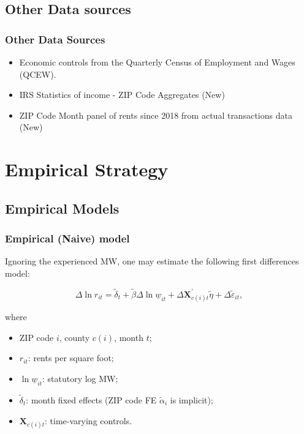 \documentclass[aspectratio=169, t]{beamer}
\newcommand{\MW}{\underline{w}}
\begin{document}
\subsection{Other Data sources}

\begin{frame}
	\frametitle{Other Data Sources} 
	
	\begin{itemize}
		\item Economic controls from the Quarterly Census of Employment and Wages 
		{\small (QCEW)}.
		\vspace{2mm}  \item IRS Statistics of income - ZIP Code Aggregates (New)
		\vspace{2mm} \item ZIP Code Month panel of rents since 2018 from actual transactions data (New)
	\end{itemize}
\end{frame}

\section{Empirical Strategy}

\subsection{Empirical Models}

\begin{frame}[label = stat_only_model]
	\frametitle{Empirical (Naive) model}
	
	Ignoring the experienced MW, one may estimate the following first differences model:
	
	$$
	\Delta \ln r_{it} = \tilde\delta_t + 
	\tilde\beta \Delta \ln \MW_{it} + 
	\Delta \mathbf{X}^{'}_{c(i)t} \tilde\eta + 
	\Delta \tilde\varepsilon_{it} ,
	$$
	
	where	
	\begin{itemize} \small
	\item ZIP code $i$, county $c(i)$, month $t$;
	
	\item \vspace{1mm} $r_{it}$: rents per square foot;
	
	\item \vspace{1mm} $\ln \MW_{it}$: statutory log MW;
	
	\item \vspace{1mm} $\tilde\delta_t$: month fixed effects (ZIP code FE $\tilde\alpha_i 
	$ is 
	implicit);
	
	\item \vspace{.5mm} $\mathbf{X}_{c(i)t}$: time-varying controls.
	\end{itemize}
\end{frame}
\end{document}
